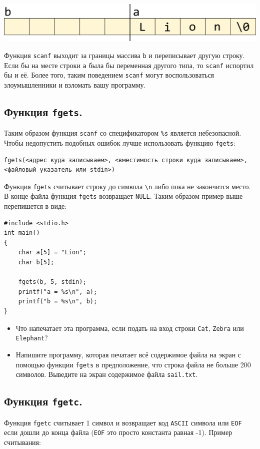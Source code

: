 \documentclass{article}
\begin{document}
\begin{center}
\includegraphics[scale=1]{../images/scanf_safety.png}
\end{center}

Функция \texttt{scanf} выходит за границы массива \texttt{b} и переписывает другую строку. Если бы на месте строки \texttt{a} была бы переменная другого типа, то \texttt{scanf} испортил бы и её. Более того, таким поведением \texttt{scanf} могут воспользоваться злоумышленники и взломать вашу программу.

\subsection*{Функция \texttt{fgets}.}
Таким образом функция \texttt{scanf} со спецификатором \texttt{\%s} является небезопасной. Чтобы недопустить подобных ошибок лучше использовать функцию \texttt{fgets}:
\begin{verbatim}
fgets(<адрес куда записываем>, <вместимость строки куда записываем>, <файловый указатель или stdin>)
\end{verbatim}
Функция \texttt{fgets} считывает строку до символа \texttt{\textbackslash n} либо пока не закончится место. В конце файла функция \texttt{fgets} возвращает \texttt{NULL}. Таким образом пример выше перепишется в виде:
\begin{lstlisting}
#include <stdio.h>
int main()
{
	char a[5] = "Lion";
	char b[5];
	
	fgets(b, 5, stdin);
	printf("a = %s\n", a);
	printf("b = %s\n", b);
}
\end{lstlisting}

\begin{itemize}
\item Что напечатает эта программа, если подать на вход строки \texttt{Cat}, \texttt{Zebra} или \texttt{Elephant}?
\item Напишите программу, которая печатает всё содержимое файла на экран с помощью функции \texttt{fgets} в предположение, что строка файла не больше 200 символов. Выведите на экран содержимое файла \texttt{sail.txt}.
\end{itemize}

\subsection*{Функция \texttt{fgetс}.}
Функция \texttt{fgetc} считывает 1 символ и возвращает код \texttt{ASCII} символа или \texttt{EOF} если дошли до конца файла (\texttt{EOF} это просто константа равная -1). Пример считывания:
\end{document}
